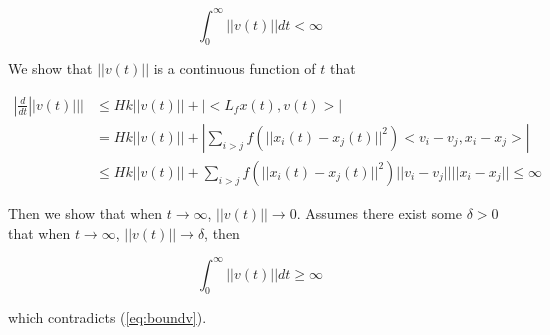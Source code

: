 \begin{equation}\label{eq:boundv}
\int_0^{\infty}||v(t)||dt<\infty
\end{equation}

\noindent
We show that $||v(t)||$ is a continuous function of $t$ that

\begin{equation}
\begin{aligned}
|\frac{d}{dt}||v(t)|||&\leq Hk||v(t)||+|<L_fx(t), v(t)>|\\
&=Hk||v(t)||+|\sum_{i>j}f(||x_i(t)-x_j(t)||^2)<v_i-v_j, x_i-x_j>|\\
&\leq Hk||v(t)||+\sum_{i>j}f(||x_i(t)-x_j(t)||^2)||v_i-v_j|| ||x_i-x_j||\leq\infty
\end{aligned}
\end{equation}

\noindent
Then we show that when $t\to\infty$, $||v(t)||\to0$. Assumes there exist some $\delta>0$ that when $t\to\infty$, $||v(t)||\to\delta$, then

\begin{equation}
\int_0^{\infty}||v(t)||dt\geq\infty
\end{equation}

\noindent
which contradicts (\ref{eq:boundv}).

\newpage
